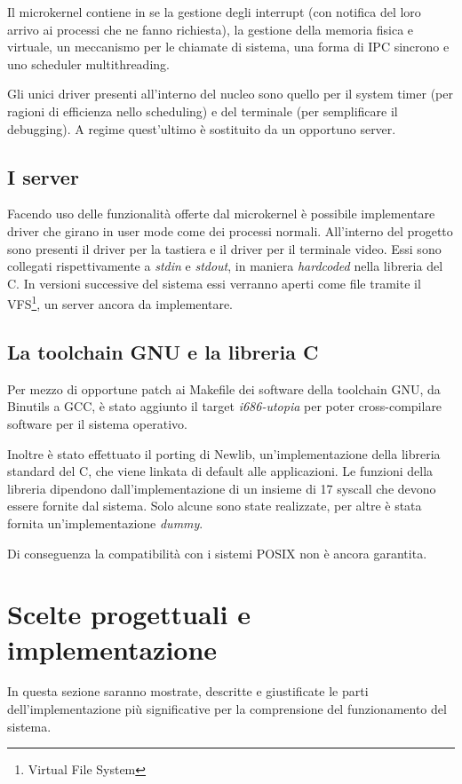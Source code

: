 \documentclass[12pt,a4paper]{report}
\begin{document}
			Il microkernel contiene in se la gestione degli interrupt (con notifica del loro arrivo ai processi
			che ne fanno richiesta), la gestione della memoria fisica e virtuale, un meccanismo per le chiamate
			di sistema, una forma di IPC sincrono e uno scheduler multithreading.
		
			Gli unici driver presenti all'interno del nucleo sono quello per il system timer (per ragioni
			di efficienza nello scheduling) e del terminale (per semplificare il debugging). A regime
			quest'ultimo è sostituito da un opportuno server.
			
		\subsection{I server}
			Facendo uso delle funzionalità offerte dal microkernel è possibile implementare driver
			che girano in user mode come dei processi normali. All'interno del progetto sono presenti
			il driver per la tastiera e il driver per il terminale video. Essi sono collegati rispettivamente
			a \emph{stdin} e \emph{stdout}, in maniera \emph{hardcoded} nella libreria del C.
			In versioni successive del sistema essi verranno aperti come file tramite il VFS\footnote{Virtual File System},
			un server ancora da implementare.
		
		\subsection{La toolchain GNU e la libreria C}
			Per mezzo di opportune patch ai Makefile dei software della toolchain GNU, da Binutils a GCC,
			è stato aggiunto il target \emph{i686-utopia} per poter cross-compilare software per il sistema operativo.
			
			Inoltre è stato effettuato il porting di Newlib, un'implementazione della libreria standard del C,
			che viene linkata di default alle applicazioni. Le funzioni della libreria dipendono dall'implementazione
			di un insieme di 17 syscall che devono essere fornite dal sistema. Solo alcune sono state realizzate,
			per altre è stata fornita un'implementazione \emph{dummy}.
			
			Di conseguenza la compatibilità con i sistemi POSIX non è ancora garantita.
	
	\section{Scelte progettuali e implementazione} 
		In questa sezione saranno mostrate, descritte e giustificate le parti dell'implementazione
		più significative per la comprensione del funzionamento del sistema.
	
\end{document}
